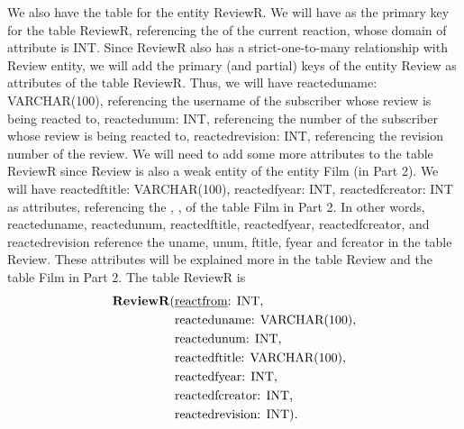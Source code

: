 \documentclass{article}
\newcommand{\key}[1]{\underline{\smash{#1}}}
\begin{document}
We also have the table for the entity ReviewR. We will have \key{reactfrom} as
the primary key for the table ReviewR, referencing the \key{id} of the current
reaction, whose domain of attribute is INT. Since ReviewR also has a
strict-one-to-many relationship with Review entity, we will add the primary (and
partial) keys of the entity Review as attributes of the table ReviewR. Thus, we
will have reacteduname: VARCHAR(100), referencing the username of the subscriber
whose review is being reacted to, reactedunum: INT, referencing the number of
the subscriber whose review is being reacted to, reactedrevision: INT,
referencing the revision number of the review. We will need to add some more
attributes to the table ReviewR since Review is also a weak entity of the entity
Film (in Part 2). We will have reactedftitle: VARCHAR(100), reactedfyear: INT,
reactedfcreator: INT as attributes, referencing the \key{title}, \key{year},
\key{creator} of the table Film in Part 2. In other words, reacteduname,
reactedunum, reactedftitle, reactedfyear, reactedfcreator, and reactedrevision
reference the uname, unum, ftitle, fyear and fcreator in the table Review. These
attributes will be explained more in the table Review and the table Film in Part
2. The table ReviewR is
\begin{align*}
    \text{\textbf{ReviewR}(} & \text{\key{reactfrom}: INT,} \\
                             & \text{reacteduname: VARCHAR(100),} \\
                             & \text{reactedunum: INT,} \\
                             & \text{reactedftitle: VARCHAR(100),} \\
                             & \text{reactedfyear: INT,} \\
                             & \text{reactedfcreator: INT,} \\
                             & \text{reactedrevision: INT).}
\end{align*}
\end{document}
